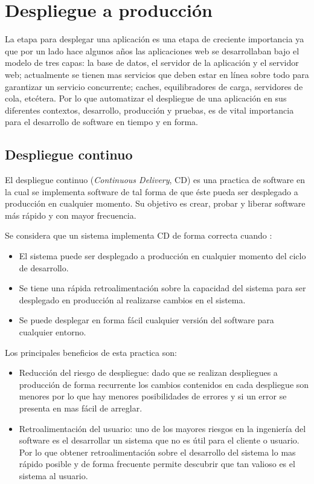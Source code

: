 \chapter{Despliegue a producción}

La etapa para desplegar una aplicación es una etapa de creciente importancia ya
que por un lado hace algunos años las aplicaciones web se desarrollaban bajo el
modelo de tres capas: la base de datos, el servidor de la aplicación y el servidor
web; actualmente se tienen mas servicios que deben estar en línea sobre todo para
garantizar un servicio concurrente; caches, equilibradores de carga, servidores
de cola, etcétera. Por lo que automatizar el despliegue de una aplicación en sus
diferentes contextos, desarrollo, producción y pruebas, es de vital importancia
para el desarrollo de software en tiempo y en forma.

\section{Despliegue continuo}

El despliegue continuo (\textit{Continuous Delivery}, CD) es una practica de software
en la cual se implementa software de tal forma de que éste pueda ser desplegado a
producción en cualquier momento\cite{27_martin_fowler_cd}. Su objetivo es crear,
probar y liberar software más rápido y con mayor frecuencia.

Se considera que un sistema implementa CD de forma correcta cuando
\cite{27_martin_fowler_cd}:
\begin{itemize}
\item El sistema puede ser desplegado a producción en cualquier momento del
  ciclo de desarrollo.
\item Se tiene una rápida retroalimentación sobre la capacidad del sistema
  para ser desplegado en producción al realizarse cambios en el sistema.
\item Se puede desplegar en forma fácil cualquier versión del software para
  cualquier entorno.
\end{itemize}

Los principales beneficios de esta practica son:
\begin{itemize}
\item Reducción del riesgo de despliegue: dado que se realizan despliegues
  a producción de forma recurrente los cambios contenidos en cada despliegue
  son menores por lo que hay menores posibilidades de errores y si un error
  se presenta en mas fácil de arreglar.
\item Retroalimentación del usuario: uno de los mayores riesgos en la ingeniería
  del software es el desarrollar un sistema que no es útil para el cliente o usuario.
  Por lo que obtener retroalimentación sobre el desarrollo del sistema lo mas
  rápido posible y de forma frecuente permite descubrir que tan valioso es el sistema
  al usuario.
\end{itemize}

